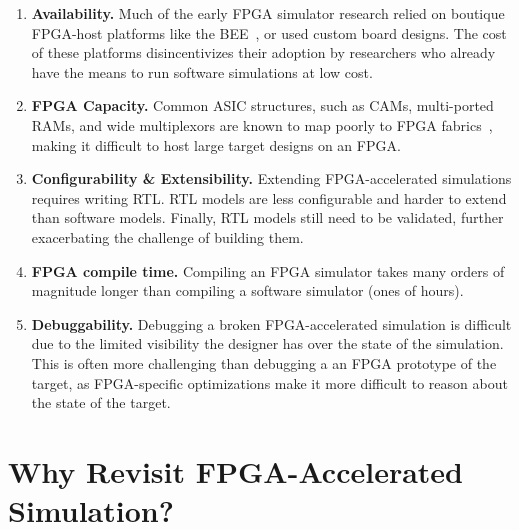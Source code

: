 \begin{enumerate}

    \item \textbf{Availability.} Much of the early FPGA simulator research
        relied on boutique FPGA-host platforms like the BEE~\cite{bee2}, or
        used custom board designs. The cost of these platforms disincentivizes
        their adoption by researchers who already have the means to run
        software simulations at low cost.

    \item \textbf{FPGA Capacity.} Common ASIC structures, such as CAMs,
        multi-ported RAMs, and wide multiplexors are known to map poorly to
        FPGA fabrics~\cite{fpgagap, fpgagap2}, making it difficult to host
        large target designs on an FPGA.

    \item \textbf{Configurability \& Extensibility.} Extending FPGA-accelerated
        simulations requires writing RTL. RTL models are less configurable and
        harder to extend than software models. Finally, RTL models still need
        to be validated, further exacerbating the challenge of building them.

    \item \textbf{FPGA compile time.} Compiling an FPGA simulator takes many
        orders of magnitude longer than compiling a software simulator (ones of hours).

    \item \textbf{Debuggability.} Debugging a broken FPGA-accelerated
        simulation is difficult due to the limited visibility the designer has
        over the state of the simulation. This is often more challenging than
        debugging a an FPGA prototype of the target, as FPGA-specific
        optimizations make it more difficult to reason about the state of the
        target.

\end{enumerate}

\section{Why Revisit FPGA-Accelerated Simulation?}

